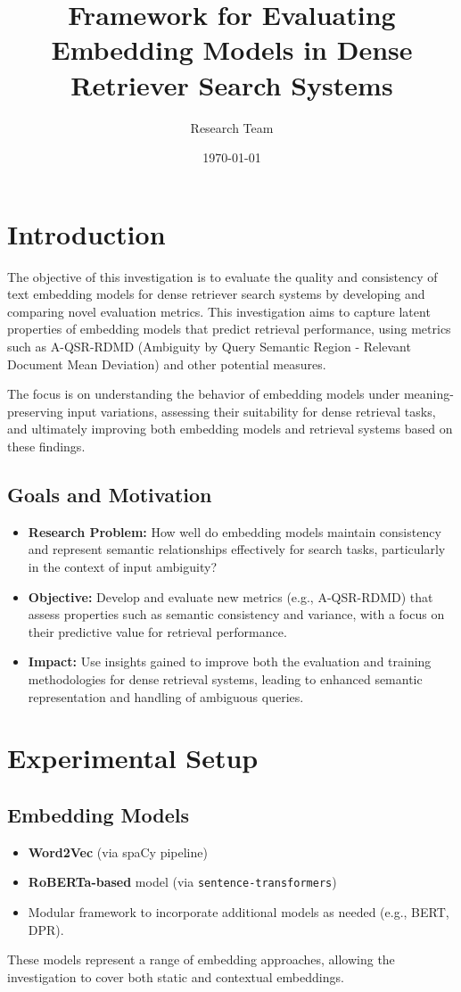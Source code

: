 \documentclass{article}
\title{Framework for Evaluating Embedding Models in Dense Retriever Search Systems}
\author{Research Team}
\date{\today}
\begin{document}
\maketitle

\section{Introduction}
The objective of this investigation is to evaluate the quality and consistency of text embedding models for dense retriever search systems by developing and comparing novel evaluation metrics. This investigation aims to capture latent properties of embedding models that predict retrieval performance, using metrics such as A-QSR-RDMD (Ambiguity by Query Semantic Region - Relevant Document Mean Deviation) and other potential measures.

The focus is on understanding the behavior of embedding models under meaning-preserving input variations, assessing their suitability for dense retrieval tasks, and ultimately improving both embedding models and retrieval systems based on these findings.

\subsection{Goals and Motivation}
\begin{itemize}
    \item \textbf{Research Problem:} How well do embedding models maintain consistency and represent semantic relationships effectively for search tasks, particularly in the context of input ambiguity?
    \item \textbf{Objective:} Develop and evaluate new metrics (e.g., A-QSR-RDMD) that assess properties such as semantic consistency and variance, with a focus on their predictive value for retrieval performance.
    \item \textbf{Impact:} Use insights gained to improve both the evaluation and training methodologies for dense retrieval systems, leading to enhanced semantic representation and handling of ambiguous queries.
\end{itemize}

\section{Experimental Setup}
\subsection{Embedding Models}
\begin{itemize}
    \item \textbf{Word2Vec} (via spaCy pipeline)
    \item \textbf{RoBERTa-based} model (via \texttt{sentence-transformers})
    \item Modular framework to incorporate additional models as needed (e.g., BERT, DPR).
\end{itemize}
These models represent a range of embedding approaches, allowing the investigation to cover both static and contextual embeddings.
\end{document}
